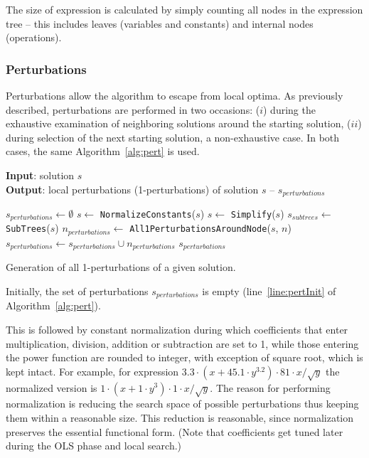 \documentclass[a4paper,12pt]{elsarticle}
\begin{document}
The size of expression is calculated by simply counting all nodes in the expression tree -- this includes leaves (variables and constants) and internal nodes (operations). 

\subsubsection{Perturbations}\label{sec:pertGen}

Perturbations allow the algorithm to escape from local optima. As previously described, perturbations are performed in two occasions: ($i$) during the exhaustive examination of neighboring solutions around the starting solution, ($ii$) during selection of the next starting solution, a non-exhaustive case.  
In both cases, the same Algorithm~\ref{alg:pert} is used. 

\begin{algorithm}
	\hspace*{\algorithmicindent} \textbf{Input}: solution $s$ \\
	\hspace*{\algorithmicindent} \textbf{Output}: local perturbations (1-perturbations) of solution $s$ -- $s_{perturbations}$
	\begin{algorithmic}[1] 
		\State $s_{perturbations} \gets \emptyset$ \label{line:pertInit}
		\State $s \gets$ \texttt{NormalizeConstants}($s$)
		\State $s \gets$ \texttt{Simplify}($s$)
		\State $s_{subtrees} \gets$ \texttt{SubTrees}($s$)
		 \label{line:forSSStart}
		\State $n_{perturbations} \gets$ \texttt{All1PerturbationsAroundNode}($s$, $n$)
		\State $s_{perturbations} \gets s_{perturbations} \cup n_{perturbations}$	
		\EndFor \label{line:forSSEnd}
		\State \Return $s_{perturbations}$
		\EndProcedure
	\end{algorithmic}
	\caption{Generation of all 1-perturbations of a given solution.}
	\label{alg:pert}
\end{algorithm}  

Initially, the set of perturbations $s_{perturbations}$ is empty (line~\ref{line:pertInit} of Algorithm~\ref{alg:pert}).


This is followed by constant normalization during which coefficients that enter multiplication, division, addition or subtraction are set to 1, while those entering the power function are rounded to integer, with exception of square root, which is kept intact. For example, for expression $3.3\cdot(x+45.1\cdot y^{3.2})\cdot 81\cdot x/\sqrt{y}$ the normalized version is $1\cdot (x+1\cdot y^3)\cdot 1\cdot x/\sqrt{y}$. The reason for performing normalization is reducing the search space of possible perturbations thus keeping them within a reasonable size. This reduction is reasonable, since normalization preserves the essential functional form. (Note that coefficients get tuned later during the OLS phase and local search.)
\end{document}
